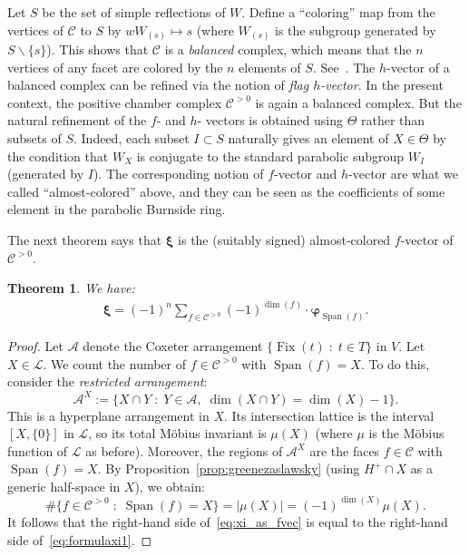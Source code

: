 \documentclass[11pt]{article}
\newtheorem{theo}{Theorem}[section]
\theoremstyle{definition}
\DeclareMathOperator{\Span}{Span}
\DeclareMathOperator{\Fix}{Fix}
\newcommand{\bphi}{\boldsymbol{\varphi}}
\newcommand{\bxi}{\boldsymbol{\xi}}
\newcommand{\LL}{\mathcal{L}}
\newcommand{\CC}{\mathcal{C}}
\newcommand{\CCP}{\mathcal{C}^{>0}}
\begin{document}
Let $S$ be the set of simple reflections of $W$.  Define a ``coloring'' map from the vertices of $\CC$ to $S$ by $w W_{(s)} \mapsto s$ (where $W_{(s)}$ is the subgroup generated by $S\backslash\{s\}$). This shows that $\CC$ is a {\it balanced} complex, which means that the $n$ vertices of any facet are colored by the $n$ elements of $S$.  See~\cite{bjorner}.  The $h$-vector of a balanced complex can be refined via the notion of {\it flag $h$-vector}.  In the present context, the positive chamber complex $\CCP$ is again a balanced complex.  But the natural refinement of the $f$- and $h$- vectors is obtained using $\Theta$ rather than subsets of $S$. Indeed, each subset $I\subset S$ naturally gives an element of $X\in \Theta$ by the condition that $W_X$ is conjugate to the standard parabolic subgroup $W_I$ (generated by $I$).  The corresponding notion of $f$-vector and $h$-vector are what we called ``almost-colored'' above, and they can be seen as the coefficients of some element in the parabolic Burnside ring.  

The next theorem says that $\bxi$ is the (suitably signed) almost-colored $f$-vector of $\CCP$.  %

\begin{theo} \label{theo:xi_fvec}
    We have:
    \begin{align} \label{eq:xi_as_fvec}
        \bxi = (-1)^n \sum_{f \in \CCP} (-1)^{\dim(f)} \cdot \bphi_{\Span(f)}.
    \end{align}
\end{theo}


\begin{proof}
    Let $\mathcal{A}$ denote the Coxeter arrangement $\{ \Fix(t) \;:\; t\in T\}$ in $V$. Let $X \in \LL$.  We count the number of $f \in \CCP$ with $\Span(f)=X$. To do this, consider the {\it restricted arrangement}:
    \[
        \mathcal{A}^X := \big\{
            X \cap Y \;:\; Y\in \mathcal{A}, \; \dim(X \cap Y) = \dim(X)-1
        \big\}.
    \]
    This is a hyperplane arrangement in $X$.  Its intersection lattice is the interval $[X,\{0\}]$ in $\LL$, so its total Möbius invariant is $\mu(X)$ (where $\mu$ is the Möbius function of $\LL$ as before). Moreover, the regions of $\mathcal{A}^X$ are the faces $f\in \CC$ with $\Span(f)=X$.  By Proposition~\ref{prop:greenezaslawsky} (using $H^+\cap X$ as a generic half-space in $X$), we obtain:
    \[
        \#\big\{ f \in \CCP \;:\; \Span(f)=X
        \big\}
            =
        |\mu(X)|
            =
        (-1)^{\dim(X)} \mu(X).
    \]
    It follows that the right-hand side of~\eqref{eq:xi_as_fvec} is equal to the right-hand side of~\eqref{eq:formulaxi1}.
\end{proof}
\end{document}
